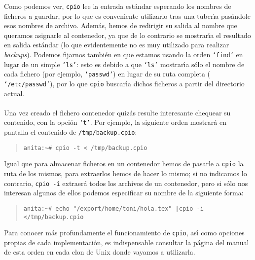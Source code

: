 Como podemos ver, {\tt cpio} lee la entrada est\'andar esperando los nombres
de ficheros a guardar, por lo que es conveniente utilizarlo tras una 
tuber\'{\i}a pas\'andole esos nombres de archivo. Adem\'as, hemos de redirigir
su salida al nombre que queramos asignarle al contenedor, ya que de lo 
contrario se mostrar\'{\i}a el resultado en salida est\'andar (lo que 
evidentemente no es muy utilizado para realizar {\it backups}). Podemos fijarnos
tambi\'en en que estamos usando la orden {\tt `find'} en lugar de un simple
{\tt `ls'}: esto es debido a que {\tt `ls'} mostrar\'{\i}a s\'olo el nombre de
cada fichero (por ejemplo, {\tt `passwd'}) en lugar de su ruta completa ({\tt
`/etc/passwd'}), por lo que {\tt cpio} buscar\'{\i}a dichos ficheros a partir
del directorio actual.\\
\\Una vez creado el fichero contenedor quiz\'as resulte interesante chequear su
contenido, con la opci\'on {\tt `t'}. Por ejemplo, la siguiente orden mostrar\'a
en pantalla el contenido de {\tt /tmp/backup.cpio}:
\begin{quote}
\begin{verbatim}
anita:~# cpio -t < /tmp/backup.cpio
\end{verbatim}
\end{quote}
Igual que para almacenar ficheros en un contenedor hemos de pasarle a {\tt cpio}
la ruta de los mismos, para extraerlos hemos de hacer lo mismo; si no indicamos
lo contrario, {\tt cpio -i} extraer\'a todos los archivos de un contenedor, pero
si s\'olo nos interesan algunos de ellos podemos especificar su nombre de la
siguiente forma:
\begin{quote}
\begin{verbatim}
anita:~# echo "/export/home/toni/hola.tex" |cpio -i </tmp/backup.cpio
\end{verbatim}
\end{quote}
Para conocer m\'as profundamente el funcionamiento de {\tt cpio}, as\'{\i}
como opciones propias de cada implementaci\'on, es indispensable consultar la
p\'agina del manual de esta orden en cada clon de Unix donde vayamos a 
utilizarla.
